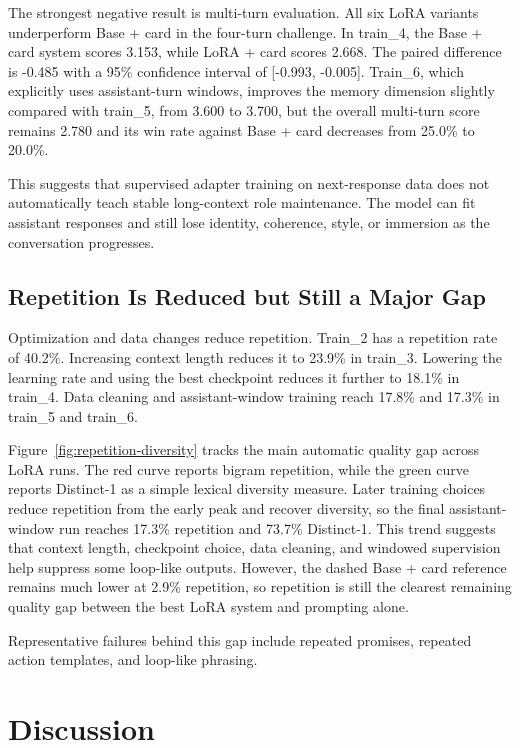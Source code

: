 \documentclass{article}
\newcommand{\card}{Base + card\xspace}
\newcommand{\lora}{LoRA + card\xspace}
\begin{document}
The strongest negative result is multi-turn evaluation. All six LoRA variants
underperform \card in the four-turn challenge. In train\_4, the \card system
scores 3.153, while \lora scores 2.668. The paired difference is -0.485 with a
95\% confidence interval of [-0.993, -0.005]. Train\_6, which explicitly uses
assistant-turn windows, improves the memory dimension slightly compared with
train\_5, from 3.600 to 3.700, but the overall multi-turn score remains 2.780
and its win rate against \card decreases from 25.0\% to 20.0\%.

This suggests that supervised adapter training on next-response data does not
automatically teach stable long-context role maintenance. The model can fit
assistant responses and still lose identity, coherence, style, or immersion as
the conversation progresses.

\subsection{Repetition Is Reduced but Still a Major Gap}

Optimization and data changes reduce repetition. Train\_2 has a repetition
rate of 40.2\%. Increasing context length reduces it to 23.9\% in train\_3.
Lowering the learning rate and using the best checkpoint reduces it further to
18.1\% in train\_4. Data cleaning and assistant-window training reach 17.8\%
and 17.3\% in train\_5 and train\_6.

\figRepetitionDiversity

Figure~\ref{fig:repetition-diversity} tracks the main automatic quality gap
across LoRA runs. The red curve reports bigram repetition, while the green
curve reports Distinct-1 as a simple lexical diversity measure. Later training
choices reduce repetition from the early peak and recover diversity, so the
final assistant-window run reaches 17.3\% repetition and 73.7\% Distinct-1.
This trend suggests that context length, checkpoint choice, data cleaning, and
windowed supervision help suppress some loop-like outputs. However, the dashed
\card reference remains much lower at 2.9\% repetition, so repetition is still
the clearest remaining quality gap between the best LoRA system and prompting
alone.

Representative failures behind this gap include repeated promises, repeated
action templates, and loop-like phrasing.

\section{Discussion}
\end{document}
